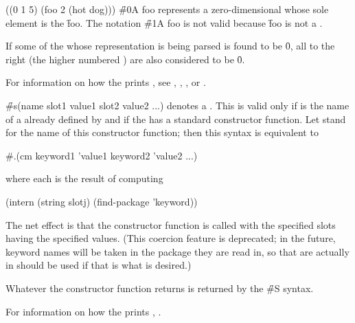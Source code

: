 \code
 ((0 1 5) (foo 2 (hot dog)))
\endcode
\f{\#0A foo} represents 
a zero-dimensional  whose sole element is the 
 \f{foo}.
The notation \f{\#1A foo} is not valid because \f{foo} is
not a .

If some  of the 
whose representation is being parsed is found to be \f{0},
all  to the right 
(\ie the higher numbered )
are also considered to be \f{0}.

For information on how the  prints ,
see \secref\PrintingStrings,
    \secref\PrintingBitVectors,
    \secref\PrintingOtherVectors,
 or \secref\PrintingOtherArrays.

\endsubsubsection%



\f{\#s(name slot1 value1 slot2 value2 ...)}
denotes a .  This is valid only if  is the name
of a   already defined by  
and if the   has a standard constructor function.
Let  stand for the name of this constructor function;
then this syntax is equivalent to

\code
 #.(cm keyword1 'value1 keyword2 'value2 ...)
\endcode

where each  is the result of computing

\code
 (intern (string slotj) (find-package 'keyword))
\endcode
    
The net effect is that the constructor function is called with the specified
slots having the specified values. 
(This coercion feature is deprecated; in the future, keyword names will 
 be taken in the package they are read in, so  that are 
 actually in  should be used if that is what is desired.)

Whatever  the constructor function returns
is returned by the \f{\#S} syntax.

For information on how the  prints ,
\seesection\PrintingStructures.

\endsubsubsection%


